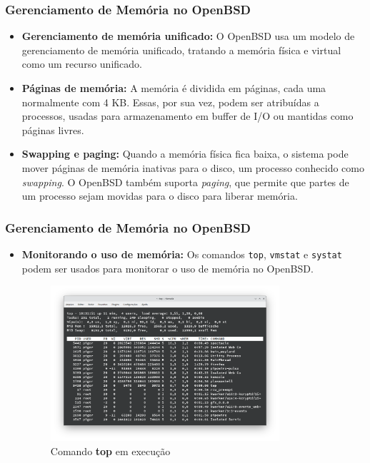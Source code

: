 \documentclass[9pt,xcolor=table]{beamer}
\begin{document}
\begin{frame}[fragile]
\frametitle{Gerenciamento de Memória no OpenBSD}
\begin{itemize}
\justifying
\item \textbf{Gerenciamento de memória unificado:} O OpenBSD usa um modelo de gerenciamento de memória unificado, tratando a memória física e virtual como um recurso unificado.

\item \textbf{Páginas de memória:} A memória é dividida em páginas, cada uma normalmente com 4 KB. Essas, por sua vez,  podem ser atribuídas a processos, usadas para armazenamento em buffer de I/O ou mantidas como páginas livres.

\item \textbf{Swapping e paging:} Quando a memória física fica baixa, o sistema pode mover páginas de memória inativas para o disco, um processo conhecido como \textit{swapping}. O OpenBSD também suporta \textit{paging}, que permite que partes de um processo sejam movidas para o disco para liberar memória.
\end{itemize}
\end{frame}
\begin{frame}[fragile]
\frametitle{Gerenciamento de Memória no OpenBSD}
\begin{itemize}
 \item \textbf{Monitorando o uso de memória:} Os comandos \verb|top|, \verb|vmstat| e \verb|systat| podem ser usados para monitorar o uso de memória no OpenBSD.
\begin{figure}
  \centering
  \includegraphics[width=0.8\textwidth]{imagens/screenshoot.png}
  \caption{Comando \textbf{top} em execução}
\end{figure}
\end{itemize}
\end{frame}
\end{document}
